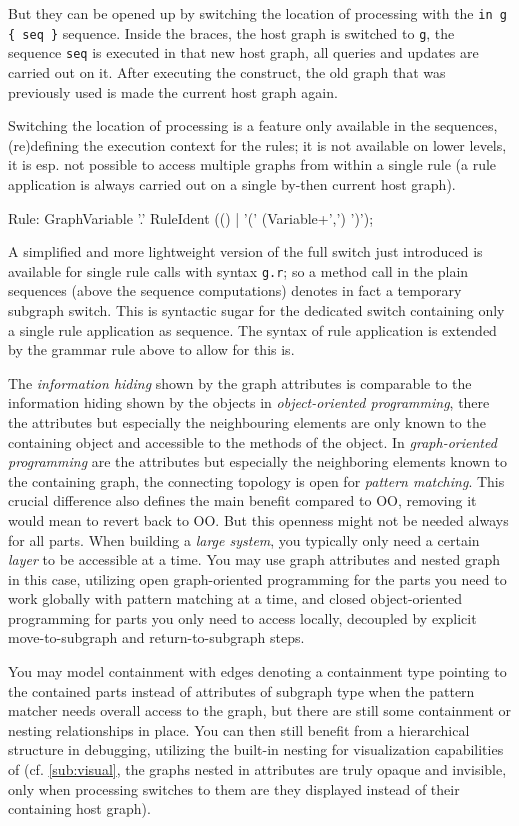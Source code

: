 But they can be opened up by switching the location of processing with the \verb#in g { seq }# sequence.
Inside the braces, the host graph is switched to \texttt{g}, the sequence \texttt{seq} is executed in that new host graph, all queries and updates are carried out on it. 
After executing the construct, the old graph that was previously used is made the current host graph again.

Switching the location of processing is a feature only available in the sequences, (re)defining the execution context for the rules; it is not available on lower levels, it is esp. not possible to access multiple graphs from within a single rule (a rule application is always carried out on a single by-then current host graph).

\begin{rail}
  Rule: GraphVariable '.' RuleIdent (() | '(' (Variable+',') ')');
\end{rail}

A simplified and more lightweight version of the full switch just introduced is available for single rule calls with syntax \verb#g.r#; so a method call in the plain sequences (above the sequence computations) denotes in fact a temporary subgraph switch.
This is syntactic sugar for the dedicated switch containing only a single rule application as sequence.
The syntax of rule application is extended by the grammar rule above to allow for this is.

The \emph{information hiding} shown by the graph attributes is comparable to the information hiding shown by the objects in \emph{object-oriented programming}, there the attributes but especially the neighbouring elements are only known to the containing object and accessible to the methods of the object.
In \emph{graph-oriented programming} are the attributes but especially the neighboring elements known to the containing graph, the connecting topology is open for \emph{pattern matching}.
This crucial difference also defines the main benefit compared to OO, removing it would mean to revert back to OO.
But this openness might not be needed always for all parts.
When building a \emph{large system}, you typically only need a certain \emph{layer} to be accessible at a time.
You may use graph attributes and nested graph in this case,
utilizing open graph-oriented programming for the parts you need to work globally with pattern matching at a time,
and closed object-oriented programming for parts you only need to access locally,
decoupled by explicit move-to-subgraph and return-to-subgraph steps.

You may model containment with edges denoting a containment type pointing to the contained parts instead of attributes of subgraph type
when the pattern matcher needs overall access to the graph, but there are still some containment or nesting relationships in place.
You can then still benefit from a hierarchical structure in debugging, utilizing the built-in nesting for visualization capabilities of \GrG (cf. \ref{sub:visual}, the graphs nested in attributes are truly opaque and invisible, only when processing switches to them are they displayed instead of their containing host graph).

